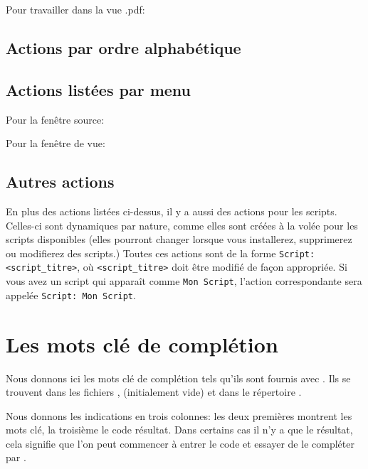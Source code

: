 Pour travailler dans la vue .pdf:


\subsection{Actions par ordre alphabétique}


\subsection{Actions listées par menu}

Pour la fenêtre source:


\bigskip
Pour la fenêtre de vue:


\subsection{Autres actions}
En plus des actions listées ci-dessus, il y a aussi des actions pour les scripts. Celles-ci sont dynamiques par nature, comme elles sont créées à la volée pour les scripts disponibles (elles pourront changer lorsque vous installerez, supprimerez ou modifierez des scripts.) Toutes ces actions sont de la forme \verb*|Script: <script_titre>|, où \verb*|<script_titre>| doit être modifié de façon appropriée. Si vous avez un script qui apparaît comme \verb|Mon Script|, l'action correspondante sera appelée \verb*|Script: Mon Script|.


\section{Les mots clé de complétion}
\label{sec.autocompletion}

Nous donnons ici les mots clé de complétion tels qu'ils sont fournis avec \Tw. Ils se trouvent dans les fichiers ,  (initialement vide) et  dans le répertoire .

Nous donnons les indications en trois colonnes: les deux premières montrent les mots clé, la troisième le code \AllTeX{} résultat. Dans certains cas il n'y a que le résultat, cela signifie que l'on peut commencer à entrer le code \AllTeX{} et essayer de le compléter par .

